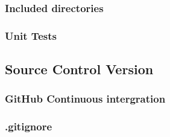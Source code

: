 \subsubsection{Included directories}

\subsubsection{Unit Tests}
\label{sec:build_unit_tests}

\subsection{Source Control Version}
\subsubsection{GitHub Continuous intergration}
\subsubsection{.gitignore}